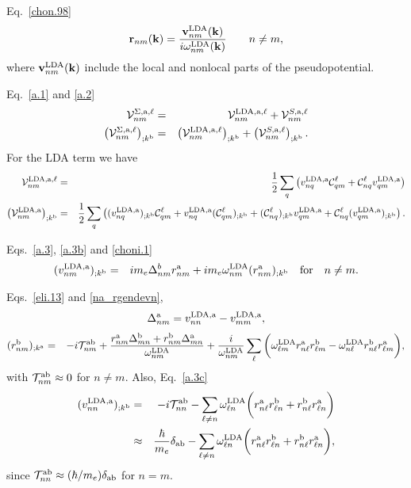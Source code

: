 Eq.~\eqref{chon.98}
\begin{eqnarray}\label{c-chon.98}
\mathbf{r}_{nm}(\mathbf{k})=\frac{\mathbf{v}^{\mathrm{LDA}}_{nm}(\mathbf{k})}{i\omega^{\mathrm{LDA}}_{nm}(\mathbf{k})}
\quad\quad n\ne m
,
\end{eqnarray}   
where $\mathbf{v}^{\mathrm{LDA}}_{nm}(\mathbf{k})$ include the local and nonlocal parts of the pseudopotential.

Eq.~\eqref{a.1} and \eqref{a.2}
\begin{eqnarray}\label{c-a.1}
{\mathbf{\cal V}}^{\Sigma,\mathrm{a},\ell}_{nm}
&=&
{\mathbf{\cal V}}^{\mathrm{LDA},\mathrm{a},\ell}_{nm}
+
{\mathbf{\cal V}}^{S,\mathrm{a},\ell}_{nm}
\nonumber\\
\left(
{\mathbf{\cal V}}^{\Sigma,\mathrm{a},\ell}_{nm}
\right)_{;k^{\mathrm{b}}}
&=&
\left(
{\mathbf{\cal V}}^{\mathrm{LDA},\mathrm{a},\ell}_{nm}
\right)_{;k^{\mathrm{b}}}
+
\left(
{\mathbf{\cal V}}^{S,\mathrm{a},\ell}_{nm}
\right)_{;k^{\mathrm{b}}}
.
\end{eqnarray}
For the LDA term we have
\begin{eqnarray}\label{c-a.2}
{\mathbf{\cal V}}^{\mathrm{LDA},\mathrm{a},\ell}_{nm}
&=&
\frac{1}{2}\sum_q\left(
v^{\mathrm{LDA},\mathrm{a}}_{nq}{\mathbf{\cal C}}^\ell_{qm}+{\mathbf{\cal C}}^\ell_{nq} v^{\mathrm{LDA},\mathrm{a}}_{qm}
\right)
\nonumber\\
\left({\mathbf{\cal V}}^{\mathrm{LDA},\mathrm{a}}_{nm}\right)_{;k^{\mathrm{b}}}
&=&
\frac{1}{2}\sum_q\left(
(v^{\mathrm{LDA},\mathrm{a}}_{nq})_{;k^{\mathrm{b}}}{\mathbf{\cal C}}^\ell_{qm}
+ 
v^{\mathrm{LDA},\mathrm{a}}_{nq}({\mathbf{\cal C}}^\ell_{qm})_{;k^{\mathrm{b}}}
+
({\mathbf{\cal C}}^\ell_{nq})_{;k^{\mathrm{b}}} v^{\mathrm{LDA},\mathrm{a}}_{qm}
+
{\mathbf{\cal C}}^\ell_{nq} (v^{\mathrm{LDA},\mathrm{a}}_{qm})_{;k^{\mathrm{b}}}
\right)
.
\end{eqnarray} 
 
Eqs.~\eqref{a.3}, \eqref{a.3b} and \eqref{choni.1}
\begin{eqnarray}\label{c-a.3}
(v^{\mathrm{LDA},\mathrm{a}}_{nm})_{;k^{\mathrm{b}}}
&=&  
im_e\Delta^b_{nm}r^{\mathrm{a}}_{nm}
+ 
im_e\omega^{\mathrm{LDA}}_{nm}(r^{\mathrm{a}}_{nm})_{;k^{\mathrm{b}}}
\quad\mathrm{for}\quad n\ne m
.
\end{eqnarray} 

Eqs.~\eqref{eli.13} and \eqref{na_rgendevn},
\begin{eqnarray}\label{c-eli.13}
\Delta_{nm}^{\mathrm{a}}
=
v_{nn}^{\mathrm{LDA},\mathrm{a}}-v_{mm}^{\mathrm{LDA},\mathrm{a}}
,
\end{eqnarray}
\begin{eqnarray}\label{c-na_rgendevn}
(r^{\mathrm{b}}_{nm})_{;k^{\mathrm{a}}}
&=&
-i{\cal T}^{\mathrm{a}\mathrm{b}}_{nm}
+
\frac{
r^{\mathrm{a}}_{nm}
\Delta^{\mathrm{b}}_{mn}
+r^{\mathrm{b}}_{nm}
\Delta^{\mathrm{a}}_{mn}
}
{\omega^{\mathrm{LDA}}_{nm}}
+
\frac{i}{\omega^{\mathrm{LDA}}_{nm}}
\sum_{\ell}
\bigg(
\omega^{\mathrm{LDA}}_{\ell m}
r^{\mathrm{a}}_{n\ell}
r^{\mathrm{b}}_{\ell m}
-
\omega^{\mathrm{LDA}}_{n\ell}
r^{\mathrm{b}}_{n\ell}
r^{\mathrm{a}}_{\ell m}
\bigg)
,
\end{eqnarray}
with ${\cal T}^{\mathrm{a}\mathrm{b}}_{nm}\approx 0$ for $n\ne m$. Also, 
Eq.~\eqref{a.3c}
\begin{eqnarray}\label{c-a.3c}
(v^{\mathrm{LDA},\mathrm{a}}_{nn})_{;k^{\mathrm{b}}}
&=&
-i{\cal T}^{\mathrm{a}\mathrm{b}}_{nn}
-
\sum_{\ell\ne n}
\omega^{\mathrm{LDA}}_{\ell n}
\bigg( 
r^{\mathrm{a}}_{n\ell} 
r^{\mathrm{b}}_{\ell n}
+ 
r^{\mathrm{b}}_{n\ell} 
r^{\mathrm{a}}_{\ell n}
\bigg)
\nonumber\\
&\approx&
\frac{\hbar}{m_e}\delta_{\mathrm{a}\mathrm{b}}
-
\sum_{\ell\ne n}
\omega^{\mathrm{LDA}}_{\ell n}
\bigg( 
r^{\mathrm{a}}_{n\ell} 
r^{\mathrm{b}}_{\ell n}
+ 
r^{\mathrm{b}}_{n\ell} 
r^{\mathrm{a}}_{\ell n}
\bigg)
,
\end{eqnarray} 
since 
${\cal T}^{\mathrm{a}\mathrm{b}}_{nn}\approx (\hbar/m_e)\delta_{\mathrm{a}\mathrm{b}}$ for $n=m$.


